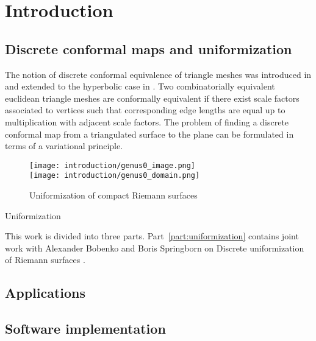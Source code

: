 \documentclass[Thesis.tex]{subfiles}
\begin{document}
\chapter{Introduction}

\section{Discrete conformal maps and uniformization}

The notion of discrete conformal equivalence of triangle meshes was introduced in \cite{Springborn2008} and extended to the hyperbolic case in \cite{Bobenko2010}. Two combinatorially equivalent euclidean triangle meshes are conformally equivalent if there exist scale factors associated to vertices such that corresponding edge lengths are equal up to multiplication with adjacent scale factors.
The problem of finding a discrete conformal map from a triangulated surface to the plane can be formulated in terms of a variational principle. 

\begin{figure}
\centering		
\texttt{[image: introduction/genus0\_image.png]}\\
\texttt{[image: introduction/genus0\_domain.png]}
\caption{Uniformization of compact Riemann surfaces}
\label{fig:intro_uniformization}
\end{figure}


\begin{theorem}{Uniformization}

\end{theorem}


This work is divided into three parts. Part~\ref{part:uniformization} contains joint work with Alexander Bobenko and Boris Springborn on Discrete uniformization of Riemann surfaces \cite{BobSechSpr}. 

\section{Applications}

\section{Software implementation}


\subfilebibliography
\end{document}

